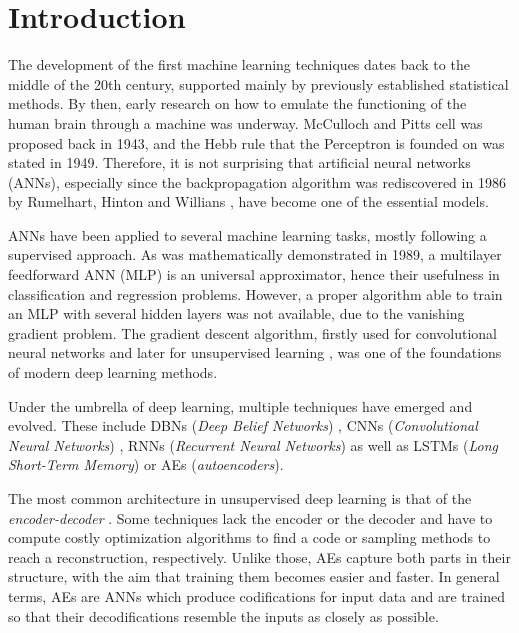 \section{Introduction}
The development of the first machine learning techniques dates back to the middle of the 20th century, supported mainly by previously established statistical methods. By then, early research on how to emulate the functioning of the human brain through a machine was underway. McCulloch and Pitts cell \cite{McCullochPitts} was proposed back in 1943, and the Hebb rule \cite{HebbRule} that the Perceptron \cite{Perceptron} is founded on was stated in 1949. Therefore, it is not surprising that artificial neural networks (ANNs), especially since the backpropagation algorithm was rediscovered in 1986 by Rumelhart, Hinton and Willians \cite{Backpropagation}, have become one of the essential models. 

ANNs have been applied to several machine learning tasks, mostly following a supervised approach. As was mathematically demonstrated \cite{ANNsUniversalApproximator} in 1989, a multilayer feedforward ANN (MLP) is an universal approximator, hence their usefulness in classification and regression problems. However, a proper algorithm able to train an MLP with several hidden layers was not available, due to the vanishing gradient \cite{VanishingGradient} problem. The gradient descent algorithm, firstly used for convolutional neural networks \cite{LeCunBackpropagation} and later for unsupervised learning \cite{HintonDBN}, was one of the foundations of modern deep learning \cite{DeepLearning} methods.

Under the umbrella of deep learning, multiple techniques have emerged and evolved. These include DBNs (\textit{Deep Belief Networks}) \cite{DBNs}, CNNs (\textit{Convolutional Neural Networks}) \cite{CNNs}, RNNs (\textit{Recurrent Neural Networks}) \cite{RNN} as well as LSTMs (\textit{Long Short-Term Memory}) \cite{LSTMs} or AEs (\textit{autoencoders}).

The most common architecture in unsupervised deep learning is that of the \textit{encoder-decoder} \cite{EnergyUnsupervised}. Some techniques lack the encoder or the decoder and have to compute costly optimization algorithms to find a code or sampling methods to reach a reconstruction, respectively. Unlike those, AEs capture both parts in their structure, with the aim that training them becomes easier and faster. In general terms, AEs are ANNs which produce codifications for input data and are trained so that their decodifications resemble the inputs as closely as possible.

